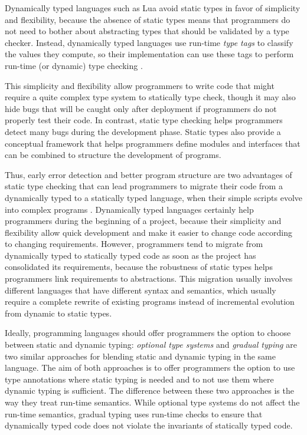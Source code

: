 Dynamically typed languages such as Lua avoid static types in favor of
simplicity and flexibility, because the absence of static types means
that programmers do not need to bother about abstracting types that
should be validated by a type checker.
Instead, dynamically typed languages use run-time \emph{type tags}
to classify the values they compute, so their implementation can use
these tags to perform run-time (or dynamic) type checking
\citep{pierce2002tpl}.

This simplicity and flexibility allow programmers to write code that
might require a quite complex type system to statically type check,
though it may also hide bugs that will be caught only after deployment
if programmers do not properly test their code.
In contrast, static type checking helps programmers detect many
bugs during the development phase.
Static types also provide a conceptual framework that helps
programmers define modules and interfaces that can be combined to
structure the development of programs.

Thus, early error detection and better program structure are two
advantages of static type checking that can lead programmers to
migrate their code from a dynamically typed to a statically
typed language, when their simple scripts evolve into complex programs
\citep{tobin-hochstadt2006ims}.
Dynamically typed languages certainly help programmers during the
beginning of a project, because their simplicity and flexibility
allow quick development and make it easier to change code according to
changing requirements.
However, programmers tend to migrate from dynamically typed to
statically typed code as soon as the project has consolidated its
requirements, because the robustness of static types helps
programmers link requirements to abstractions.
This migration usually involves different languages that have
different syntax and semantics, which usually require a complete
rewrite of existing programs instead of incremental evolution from
dynamic to static types.

Ideally, programming languages should offer programmers the
option to choose between static and dynamic typing:
\emph{optional type systems} \citep{bracha2004pluggable} and
\emph{gradual typing} \citep{siek2006gradual} are two similar
approaches for blending static and dynamic typing in the same
language.
The aim of both approaches is to offer programmers the option
to use type annotations where static typing is needed and to not use
them where dynamic typing is sufficient.
The difference between these two approaches is the way they treat
run-time semantics.
While optional type systems do not affect the run-time semantics,
gradual typing uses run-time checks to ensure that dynamically typed
code does not violate the invariants of statically typed code.

